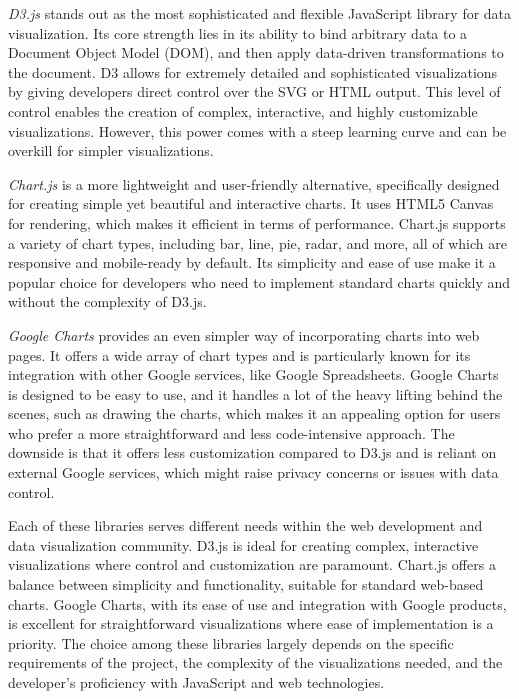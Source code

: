 \emph{D3.js} stands out as the most sophisticated and flexible JavaScript library for data visualization. Its core strength lies in its ability to bind arbitrary data to a Document Object Model (DOM), and then apply data-driven transformations to the document. D3 allows for extremely detailed and sophisticated visualizations by giving developers direct control over the SVG or HTML output. This level of control enables the creation of complex, interactive, and highly customizable visualizations. However, this power comes with a steep learning curve and can be overkill for simpler visualizations.

\emph{Chart.js} is a more lightweight and user-friendly alternative, specifically designed for creating simple yet beautiful and interactive charts. It uses HTML5 Canvas for rendering, which makes it efficient in terms of performance. Chart.js supports a variety of chart types, including bar, line, pie, radar, and more, all of which are responsive and mobile-ready by default. Its simplicity and ease of use make it a popular choice for developers who need to implement standard charts quickly and without the complexity of D3.js.

\emph{Google Charts} provides an even simpler way of incorporating charts into web pages. It offers a wide array of chart types and is particularly known for its integration with other Google services, like Google Spreadsheets. Google Charts is designed to be easy to use, and it handles a lot of the heavy lifting behind the scenes, such as drawing the charts, which makes it an appealing option for users who prefer a more straightforward and less code-intensive approach. The downside is that it offers less customization compared to D3.js and is reliant on external Google services, which might raise privacy concerns or issues with data control.

Each of these libraries serves different needs within the web development and data visualization community. D3.js is ideal for creating complex, interactive visualizations where control and customization are paramount. Chart.js offers a balance between simplicity and functionality, suitable for standard web-based charts. Google Charts, with its ease of use and integration with Google products, is excellent for straightforward visualizations where ease of implementation is a priority. The choice among these libraries largely depends on the specific requirements of the project, the complexity of the visualizations needed, and the developer's proficiency with JavaScript and web technologies.

